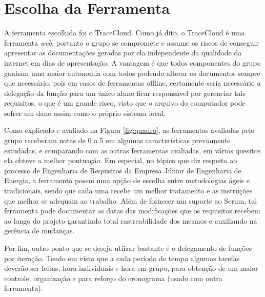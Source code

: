 \section[Escolha da Ferramenta]{Escolha da Ferramenta}
A ferramenta escolhida foi o TraceCloud. Como já dito, o TraceCloud é uma ferramenta \textit{web}, portanto o grupo se compromete e assume os riscos de conseguir apresentar as documentações geradas por ela independente da qualidade da internet em dias de apresentação. 
A vantagem é que todos componentes do grupo ganham uma maior autonomia com todos podendo alterar os documentos sempre que necessário, 
pois em casos de ferramentas offline, certamente seria necessário a delegação da função para um único aluno ficar responsável por gerenciar 
tais requisitos, o que é um grande risco, visto que o arquivo do computador pode sofrer um dano assim como o próprio sistema local.

Como explicado e avaliado na Figura \ref{fig:quadro}, as ferramentas avaliadas pelo grupo receberam notas de 0 a 5 em algumas características 
previamente estudadas, e comparando com as outras ferramentas avaliadas, em vários quesitos ela obteve a melhor pontuação. 
Em especial, no tópico que diz respeito ao processo de Engenharia de Requisitos da Empresa Júnior de Engenharia de Energia, a ferramenta possui 
uma opção de escolha entre metodologias ágeis e tradicionais, sendo que cada uma recebe um melhor tratamento e as instruções que melhor se adequam 
ao trabalho. Além de fornecer um suporte ao Scrum, tal ferramenta pode documentar as datas das modificações que os requisitos recebem ao longo do 
projeto garantindo total rastreabilidade dos mesmos e auxiliando na gerência de mudanças.

Por fim, outro ponto que se deseja utiizar bastante é o delegamento de funções por iteração. Tendo em vista que a cada período de tempo 
algumas tarefas deverão ser feitas, hora individuais e hora em grupo, para obtenção de um maior controle, organização e para reforço do 
cronograma (usado com outra ferramenta).
